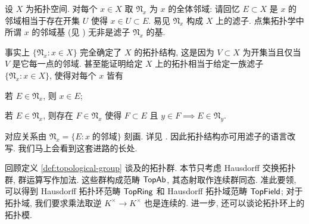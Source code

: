 \begin{example}\label{eg:nbd-filter}
	设 $X$ 为拓扑空间. 对每个 $x \in X$ 取 $\mathfrak{N}_x$ 为 $x$ 的全体邻域: 请回忆 $E \subset X$ 是 $x$ 的邻域相当于存在开集 $U$ 使得 $x \in U \subset E$. 易见 $\mathfrak{N}_x$ 构成 $X$ 上的滤子. 点集拓扑学中所谓 $x$ 的邻域基 (见 \cite[定义 2.6.3]{Xiong}) 无非是滤子 $\mathfrak{N}_x$ 的基.

	事实上 $\{ \mathfrak{N}_x : x \in X \}$ 完全确定了 $X$ 的拓扑结构, 这是因为 $V \subset X$ 为开集当且仅当 $V$ 是它每一点的邻域. 甚至能证明给定 $X$ 上的拓扑相当于给定一族滤子 $\{ \mathfrak{N}_x  : x \in X\}$, 使得对每个 $x$ 皆有
	\begin{compactitem}
		\item 若 $E \in \mathfrak{N}_x$, 则 $x \in E$;
		\item 若 $E \in \mathfrak{N}_x$, 则存在 $F \in \mathfrak{N}_x$ 使得 $F \subset E$ 且 $y \in F \implies E \in \mathfrak{N}_y$.
	\end{compactitem}
	对应关系由 $\mathfrak{N}_x = \{E : x\; \text{的邻域}\}$ 刻画. 详见 \cite[定理 2.2.3]{Xiong}. 因此拓扑结构亦可用滤子的语言改写. 我们马上会看到这套进路的长处.
\end{example}

回顾定义 \ref{def:topological-group} 谈及的拓扑群. 本节只考虑 Hausdorff 交换拓扑群, 群运算写作加法. 这些群构成范畴 $\mathsf{TopAb}$, 其态射取作连续群同态. 准此要领, 可以得到 Hausdorff 拓扑环范畴 $\mathsf{TopRing}$ 和 Hausdorff 拓扑域范畴 $\mathsf{TopField}$; 对于拓扑域, 我们要求乘法取逆 $K^\times \to K^\times$ 也是连续的. 进一步, 还可以谈论拓扑环上的拓扑模.   

